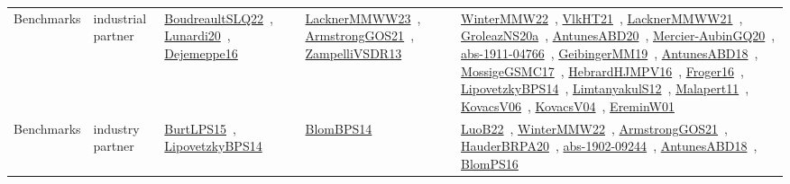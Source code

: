 {\begin{longtable}{lp{3cm}>{\raggedright\arraybackslash}p{6cm}>{\raggedright\arraybackslash}p{6cm}>{\raggedright\arraybackslash}p{8cm}}
Benchmarks & industrial partner & \href{../works/BoudreaultSLQ22.pdf}{BoudreaultSLQ22}~\cite{BoudreaultSLQ22}, \href{../works/Lunardi20.pdf}{Lunardi20}~\cite{Lunardi20}, \href{../works/Dejemeppe16.pdf}{Dejemeppe16}~\cite{Dejemeppe16} & \href{../works/LacknerMMWW23.pdf}{LacknerMMWW23}~\cite{LacknerMMWW23}, \href{../works/ArmstrongGOS21.pdf}{ArmstrongGOS21}~\cite{ArmstrongGOS21}, \href{../works/ZampelliVSDR13.pdf}{ZampelliVSDR13}~\cite{ZampelliVSDR13} & \href{../works/WinterMMW22.pdf}{WinterMMW22}~\cite{WinterMMW22}, \href{../works/VlkHT21.pdf}{VlkHT21}~\cite{VlkHT21}, \href{../works/LacknerMMWW21.pdf}{LacknerMMWW21}~\cite{LacknerMMWW21}, \href{../works/GroleazNS20a.pdf}{GroleazNS20a}~\cite{GroleazNS20a}, \href{../works/AntunesABD20.pdf}{AntunesABD20}~\cite{AntunesABD20}, \href{../works/Mercier-AubinGQ20.pdf}{Mercier-AubinGQ20}~\cite{Mercier-AubinGQ20}, \href{../works/abs-1911-04766.pdf}{abs-1911-04766}~\cite{abs-1911-04766}, \href{../works/GeibingerMM19.pdf}{GeibingerMM19}~\cite{GeibingerMM19}, \href{../works/AntunesABD18.pdf}{AntunesABD18}~\cite{AntunesABD18}, \href{../works/MossigeGSMC17.pdf}{MossigeGSMC17}~\cite{MossigeGSMC17}, \href{../works/HebrardHJMPV16.pdf}{HebrardHJMPV16}~\cite{HebrardHJMPV16}, \href{../works/Froger16.pdf}{Froger16}~\cite{Froger16}, \href{../works/LipovetzkyBPS14.pdf}{LipovetzkyBPS14}~\cite{LipovetzkyBPS14}, \href{../works/LimtanyakulS12.pdf}{LimtanyakulS12}~\cite{LimtanyakulS12}, \href{../works/Malapert11.pdf}{Malapert11}~\cite{Malapert11}, \href{../works/KovacsV06.pdf}{KovacsV06}~\cite{KovacsV06}, \href{../works/KovacsV04.pdf}{KovacsV04}~\cite{KovacsV04}, \href{../works/EreminW01.pdf}{EreminW01}~\cite{EreminW01}\\
Benchmarks & industry partner & \href{../works/BurtLPS15.pdf}{BurtLPS15}~\cite{BurtLPS15}, \href{../works/LipovetzkyBPS14.pdf}{LipovetzkyBPS14}~\cite{LipovetzkyBPS14} & \href{../works/BlomBPS14.pdf}{BlomBPS14}~\cite{BlomBPS14} & \href{../works/LuoB22.pdf}{LuoB22}~\cite{LuoB22}, \href{../works/WinterMMW22.pdf}{WinterMMW22}~\cite{WinterMMW22}, \href{../works/ArmstrongGOS21.pdf}{ArmstrongGOS21}~\cite{ArmstrongGOS21}, \href{../works/HauderBRPA20.pdf}{HauderBRPA20}~\cite{HauderBRPA20}, \href{../works/abs-1902-09244.pdf}{abs-1902-09244}~\cite{abs-1902-09244}, \href{../works/AntunesABD18.pdf}{AntunesABD18}~\cite{AntunesABD18}, \href{../works/BlomPS16.pdf}{BlomPS16}~\cite{BlomPS16}\\

\end{longtable}}
